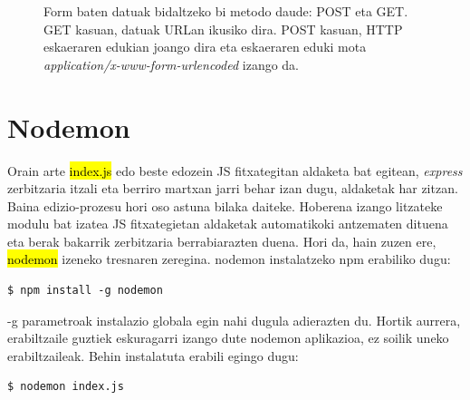 \begin{figure}[ht]
	\centering
{}
\caption{Form baten datuak bidaltzeko bi metodo daude: POST eta GET. GET kasuan, datuak URLan ikusiko dira. POST kasuan, HTTP eskaeraren edukian joango dira eta eskaeraren eduki mota \textit{application/x-www-form-urlencoded} izango da.}
\label{fig:form-urlencoded}
\end{figure}

\section{Nodemon}
Orain arte \hl{index.js} edo beste edozein JS fitxategitan aldaketa bat egitean, \textit{express} zerbitzaria itzali eta berriro martxan jarri behar izan dugu, aldaketak har zitzan. Baina edizio-prozesu hori oso astuna bilaka daiteke. Hoberena izango litzateke modulu bat izatea JS fitxategietan aldaketak automatikoki antzematen dituena eta berak bakarrik zerbitzaria berrabiarazten duena. Hori da, hain zuzen ere, \hl{nodemon} izeneko tresnaren zeregina. nodemon instalatzeko npm erabiliko dugu:

\begin{lstlisting}
$ npm install -g nodemon    
\end{lstlisting}

-g parametroak instalazio globala egin nahi dugula adierazten du. Hortik aurrera, erabiltzaile guztiek eskuragarri izango dute nodemon aplikazioa, ez soilik uneko erabiltzaileak. Behin instalatuta erabili egingo dugu:

\begin{lstlisting}
$ nodemon index.js
\end{lstlisting}

